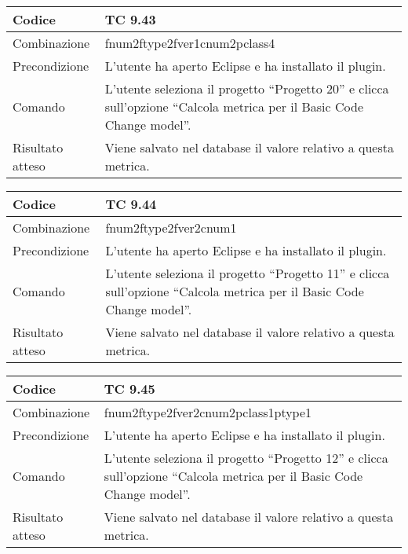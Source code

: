 \clearpage

\begin{table}[ht]
\begin{tabular}{|p{3cm}|p{9cm}|}
\hline
\cellcolor{lightgray}Codice				& TC 9.43								\\
\hline
\cellcolor{lightgray}Combinazione		& fnum2ftype2fver1cnum2pclass4									\\
\hline
\cellcolor{lightgray}Precondizione		& L'utente ha aperto Eclipse e ha installato il plugin.		\\
\hline
\cellcolor{lightgray}Comando			& L'utente seleziona il progetto ``Progetto 20''  e clicca sull'opzione ``Calcola metrica per il Basic Code Change model''.	\\
\hline
\cellcolor{lightgray}Risultato atteso	& Viene salvato nel database il valore relativo a questa metrica.\\
\hline
\end{tabular}
\end{table}

\begin{table}[ht]
\begin{tabular}{|p{3cm}|p{9cm}|}
\hline
\cellcolor{lightgray}Codice				& TC 9.44								\\
\hline
\cellcolor{lightgray}Combinazione		& fnum2ftype2fver2cnum1									\\
\hline
\cellcolor{lightgray}Precondizione		& L'utente ha aperto Eclipse e ha installato il plugin.		\\
\hline
\cellcolor{lightgray}Comando			& L'utente seleziona il progetto ``Progetto 11''  e clicca sull'opzione ``Calcola metrica per il Basic Code Change model''.	\\
\hline
\cellcolor{lightgray}Risultato atteso	& Viene salvato nel database il valore relativo a questa metrica.\\
\hline
\end{tabular}
\end{table}

\begin{table}[ht]
\begin{tabular}{|p{3cm}|p{9cm}|}
\hline
\cellcolor{lightgray}Codice				& TC 9.45								\\
\hline
\cellcolor{lightgray}Combinazione		& fnum2ftype2fver2cnum2pclass1ptype1									\\
\hline
\cellcolor{lightgray}Precondizione		& L'utente ha aperto Eclipse e ha installato il plugin.		\\
\hline
\cellcolor{lightgray}Comando			& L'utente seleziona il progetto ``Progetto 12''  e clicca sull'opzione ``Calcola metrica per il Basic Code Change model''.	\\
\hline
\cellcolor{lightgray}Risultato atteso	& Viene salvato nel database il valore relativo a questa metrica.\\
\hline
\end{tabular}
\end{table}

